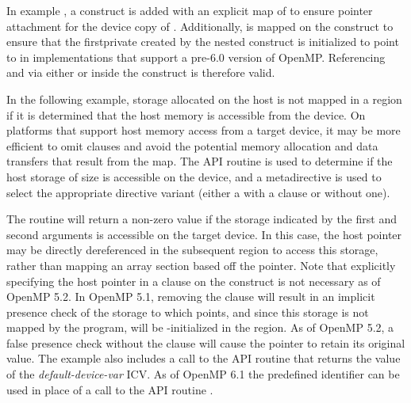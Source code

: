 
In example , a  construct is
added with an explicit map of  to ensure pointer attachment for
the device copy of . Additionally,  is mapped on the
 construct to ensure that the firstprivate 
created by the nested  construct is initialized to point to
 in implementations that support a pre-6.0 version of OpenMP.
Referencing  and  via either  or  inside
the  construct is therefore valid.



In the following example, storage allocated on the host is not mapped in a
 region if it is determined that the host memory is accessible
from the device. On platforms that support host memory access from a target
device, it may be more efficient to omit  clauses and avoid the
potential memory allocation and data transfers that result from the map. The
 API routine is used to determine if the host
storage of size  is accessible on the device, and a
metadirective is used to select the appropriate directive variant (either a
 with a  clause or without one).

The  routine will return a non-zero value if the storage
indicated by the first and second arguments is accessible on the target device.
In this case, the host pointer  may be directly dereferenced in the
subsequent  region to access this storage, rather than mapping an
array section based off the pointer. Note that explicitly specifying the host
pointer in a  clause on the construct is not necessary as
of OpenMP 5.2. In OpenMP 5.1, removing the  clause will
result in an implicit presence check of the storage to which 
points, and since this storage is not mapped by the program,  will
be -initialized in the  region. As of OpenMP 5.2, a
false presence check without the  clause will cause the
pointer to retain its original value.
The example also includes a call to the API routine  that 
returns the value of the \textit{default-device-var} ICV. 
As of OpenMP 6.1 the  predefined identifier 
can be used in place of a call to the API routine .

